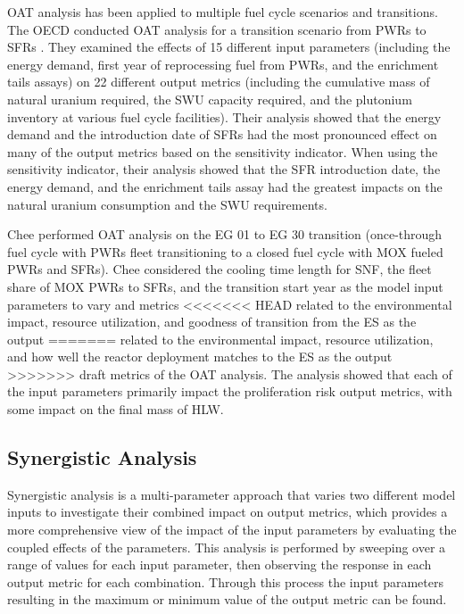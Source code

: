 \gls{OAT} analysis has been applied to multiple fuel cycle scenarios and 
transitions. The \gls{OECD} conducted \gls{OAT} analysis for a transition scenario 
from \glspl{PWR} to \glspl{SFR} \cite{noauthor_effects_2017}. They examined 
the effects of 15 different 
input parameters (including the energy demand, first year of reprocessing fuel 
from \glspl{PWR}, and the enrichment tails assays) on 22 different output metrics 
(including the cumulative mass of natural uranium required, the \gls{SWU} capacity 
required, and the plutonium inventory at various fuel cycle facilities). 
Their analysis showed that the energy demand and the introduction date of 
\glspl{SFR} had the most pronounced effect on many of the output metrics 
based on the 
sensitivity indicator. When using the sensitivity indicator, their analysis 
showed that the \gls{SFR} introduction date, the energy demand, and the 
enrichment tails assay had the greatest impacts on the natural uranium 
consumption and the \gls{SWU} requirements. 

Chee \cite{chee_sensitivity_2019} performed \gls{OAT} analysis on the \gls{EG} 
01 to \gls{EG} 30 transition 
(once-through fuel cycle with \glspl{PWR} fleet transitioning to a 
closed fuel cycle with \gls{MOX} fueled \glspl{PWR} and \glspl{SFR}). 
Chee considered the cooling time length 
for \gls{SNF}, the fleet share of \gls{MOX} \glspl{PWR} to \glspl{SFR}, and 
the transition start year as the model input parameters to vary and metrics 
<<<<<<< HEAD
related to the environmental impact, resource utilization, and goodness of 
transition from the \gls{ES} \cite{wigeland_nuclear_2014} as the output 
=======
related to the environmental impact, resource utilization, and how well 
the reactor deployment matches to the \gls{ES} \cite{wigeland_nuclear_2014} 
as the output 
>>>>>>> draft
metrics of the \gls{OAT} analysis. The analysis showed 
that each of the input parameters primarily impact the proliferation risk 
output metrics, with some impact on the final mass of \gls{HLW}. 

\subsection{Synergistic Analysis}\label{sec:synergistic_background}
Synergistic analysis is a multi-parameter approach that varies two different 
model inputs to investigate their combined impact on output metrics, 
which provides a more comprehensive view of the impact of the input 
parameters by evaluating the coupled effects of the parameters.
This analysis is performed by sweeping over a range of values for each input 
parameter, then observing the response in each output metric for each 
combination. Through this process the input parameters resulting in the 
maximum or minimum value of the output metric can be found. 

